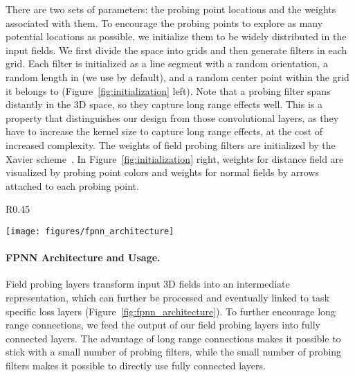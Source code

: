 \documentclass{article}
\begin{document}
There are two sets of parameters: the probing point locations and the weights associated with them. To encourage the probing points to explore as many potential locations as possible, we initialize them to be widely distributed in the input fields. We first divide the space into  grids and then generate  filters in each grid. Each filter is initialized as a line segment with a random orientation, a random length in  (we use  by default), and a random center point within the grid it belongs to (Figure~\ref{fig:initialization} left). Note that a probing filter spans distantly in the 3D space, so they capture long range effects well. This is a property that distinguishes our design from those convolutional layers, as they have to increase the kernel size to capture long range effects, at the cost of increased complexity. The weights of field probing filters are initialized by the Xavier scheme~\cite{glorot2010understanding}. In Figure~\ref{fig:initialization} right, weights for distance field are visualized by probing point colors and weights for normal fields by arrows attached to each probing point.


\begin{wrapfigure}{R}{0.45\linewidth}
	\vspace{-1.4cm}
	\begin{center}
		\texttt{[image: figures/fpnn\_architecture]}
	\end{center}
	\vspace{-0.4cm}
	\caption{FPNN architecture. Field probing layers can be used together with other inference layers to minimize task specific losses.}
	\label{fig:fpnn_architecture}
	\vspace{-0.5cm}
\end{wrapfigure}

\paragraph{FPNN Architecture and Usage.} Field probing layers transform input 3D fields into an intermediate representation, which can further be processed and eventually linked to task specific loss layers (Figure~\ref{fig:fpnn_architecture}). To further encourage long range connections, we feed the output of our field probing layers into fully connected layers. The advantage of long range connections makes it possible to stick with a small number of probing filters, while the small number of probing filters makes it possible to directly use fully connected layers.
\end{document}
